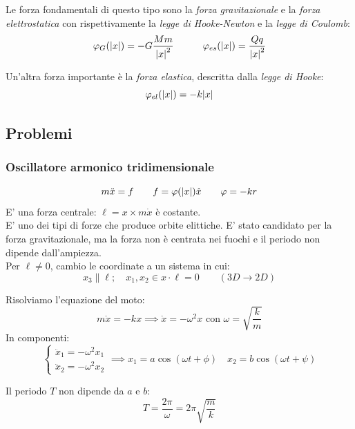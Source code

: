 Le forza fondamentali di questo tipo sono la \textit{forza gravitazionale} e la \textit{forza elettrostatica} 
con rispettivamente la \textit{legge di Hooke-Newton} e la \textit{legge di Coulomb}:
\begin{equation}
    \varphi_G(\abs{x})= -G\frac{Mm}{\abs{x}^2}\qquad \quad \varphi_{es}(\abs{x})=\frac{Qq}{\abs{x}^2}
\end{equation}

Un'altra forza importante è la \textit{forza elastica}, descritta dalla \textit{legge di Hooke}:
\begin{equation}
    \varphi_{el}(\abs{x})= -k\abs{x}
\end{equation}



\subsection{Problemi}


\subsubsection{Oscillatore armonico tridimensionale}
\begin{equation}
    m\ddot{x}= f \qquad f = \varphi(\abs{x})\hat{x}\qquad \varphi = -kr
\end{equation}
E' una forza centrale: $\ell= x\times m\dot{x}$ è costante.\\
E' uno dei tipi di forze che produce orbite elittiche. 
E' stato candidato per la forza gravitazionale, ma la forza non è centrata nei fuochi
e il periodo non dipende dall'ampiezza.\\

Per $\ell  \neq 0$, cambio le coordinate a un sistema in cui:
\begin{equation}
    x_3 \parallel \ell; \quad x_1,x_2 \in x\cdot\ell=0  \qquad (3D\rightarrow 2D)
\end{equation}

Risolviamo l'equazione del moto:
\begin{equation*}
    m\ddot{x}= -kx \implies \ddot{x}= -\omega^2 x \text{ con } \omega= \sqrt{\frac{k}{m}}
\end{equation*}
In componenti:
\begin{equation}
    \begin{cases}
        \ddot{x}_1= -\omega^2 x_1\\
        \ddot{x}_2= -\omega^2 x_2
    \end{cases}\implies
    x_1 = a \cos(\omega t +\phi)\quad x_2= b\cos(\omega t + \psi)
\end{equation}
\begin{remark}
    Il periodo $T$ non dipende da $a$ e $b$:
    \begin{equation}
        T = \frac{2\pi}{\omega}= 2\pi\sqrt{\frac{m}{k}}
    \end{equation} 
\end{remark}

